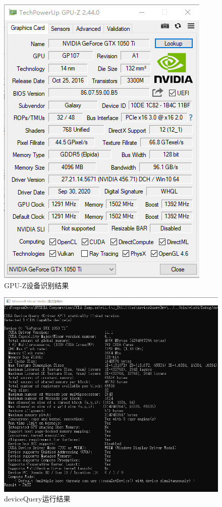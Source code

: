 \documentclass[UTF8]{ctexart}
\begin{document}
        \begin{figure}[H]
            \centering
            \includegraphics[scale=0.65]{./figures/CUDA-z.png}
            \caption{\textup{\heiti GPU-Z设备识别结果} }
            \label{fig:GPUZ}
        \end{figure}
        \begin{figure}[H]
            \centering
            \includegraphics[scale=0.7]{./figures/device.png}
            \caption{\textup{\heiti deviceQuery运行结果} }
            \label{fig:device}
        \end{figure}
\end{document}
